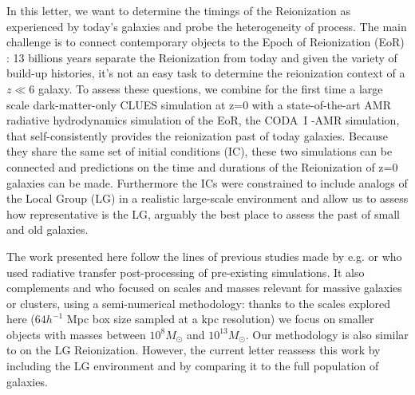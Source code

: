 \documentclass[twocolumn]{aastex61}
\begin{document}
In this letter, we want to determine the timings of the Reionization as experienced by today's galaxies and probe the heterogeneity of process. The main challenge is to connect contemporary objects to the Epoch of Reionization (EoR) : 13 billions years separate the Reionization from today and given the variety of build-up histories, it's not an easy task to determine the reionization context of a $z\ll6$ galaxy. To assess these questions, we combine for the first time a large scale dark-matter-only CLUES simulation at z=0 with a state-of-the-art AMR radiative hydrodynamics simulation of the EoR, the CODA~I -AMR simulation, that self-consistently provides the reionization past of today galaxies. Because they share the same set of initial conditions (IC), these two simulations can be connected and predictions on the time and durations of the Reionization of z=0 galaxies can be made. Furthermore the ICs were constrained to include analogs of the Local Group (LG) in a realistic large-scale environment and allow us to assess how representative is the LG, arguably the best place to assess the past of small and old galaxies.  



The work presented here follow the lines of previous studies made by e.g. \citet{WEI07} or \citet{DIX17} who used radiative transfer post-processing of pre-existing simulations. It also complements \citet{ALV9} and \citet{LI14} who focused on scales and masses relevant for massive galaxies or clusters, using a semi-numerical methodology: thanks to the scales explored here ($64 h^{-1}$ Mpc box size sampled at a kpc resolution) we focus on smaller objects with masses between $10^8 M_\odot$ and $10^{13} M_\odot$. 
Our methodology is also similar to \citet{OCV14} on the LG Reionization. However, the current letter reassess this work by including the LG environment and by comparing it to the full population of galaxies. %
\end{document}
